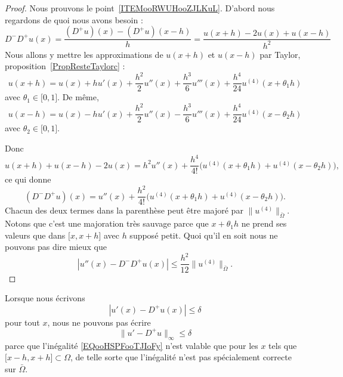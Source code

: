 \begin{proof}
	Nous prouvons le point~\ref{ITEMooRWUHooZJLKuL}. D'abord nous regardons de quoi nous avons besoin :
	\begin{equation}        \label{EQooBLIIooWHXbqD}
		D^-D^+u(x)=\frac{ (D^+u)(x)-(D^+u)(x-h) }{ h }=\frac{ u(x+h)-2u(x)+u(x-h) }{ h^2 }
	\end{equation}
	Nous allons y mettre les approximations de \( u(x+h)\) et \( u(x-h)\) par Taylor, proposition~\ref{PropResteTaylorc} :
	\begin{equation}
		u(x+h)=u(x)+hu'(x)+\frac{ h^2 }{2}u''(x)+\frac{ h^3 }{ 6 }u'''(x)+\frac{ h^4 }{ 24 }u^{(4)}(x+\theta_1h)
	\end{equation}
	avec \( \theta_1\in \mathopen[ 0 , 1 \mathclose]\). De même,
	\begin{equation}
		u(x-h)=u(x)-hu'(x)+\frac{ h^2 }{2}u''(x)-\frac{ h^3 }{ 6 }u'''(x)+\frac{ h^4 }{ 24 }u^{(4)}(x-\theta_2h)
	\end{equation}
	avec \( \theta_2\in \mathopen[ 0 , 1 \mathclose]\).

	Donc
	\begin{equation}
		u(x+h)+u(x-h)-2u(x)=h^2u''(x)+\frac{ h^4 }{ 4! }\Big( u^{(4)}(x+\theta_1h)+u^{(4)}(x-\theta_2h) \Big),
	\end{equation}
	ce qui donne
	\begin{equation}
		(D^-D^+u)(x)=u''(x)+\frac{ h^2 }{ 4! }\Big( u^{(4)}(x+\theta_1h)+u^{(4)}(x-\theta_2h) \Big).
	\end{equation}
	Chacun des deux termes dans la parenthèse peut être majoré par \( \| u^{(4)} \|_{\bar\Omega}\). Notons que c'est une majoration très sauvage parce que \( x+\theta_1h\) ne prend ses valeurs que dans \( \mathopen[ x , x+h \mathclose]\) avec \( h\) supposé petit. Quoi qu'il en soit nous ne pouvons pas dire mieux que
	\begin{equation}
		| u''(x)-D^-D^+u(x) |\leq \frac{ h^2 }{ 12 }\| u^{(4)} \|_{\bar\Omega}.
	\end{equation}
\end{proof}

\begin{remark}
	Lorsque nous écrivons
	\begin{equation}        \label{EQooHSPFooTJIoFy}
		| u'(x)-D^+u(x) |\leq \delta
	\end{equation}
	pour tout \( x\), nous ne pouvons pas écrire
	\begin{equation}
		\| u'-D^+u \|_{\infty}\leq \delta
	\end{equation}
	parce que l'inégalité \eqref{EQooHSPFooTJIoFy} n'est valable que pour les \( x\) tels que \( \mathopen[ x-h , x+h \mathclose]\subset \Omega\), de telle sorte que l'inégalité n'est pas spécialement correcte sur \( \bar\Omega\).
\end{remark}

